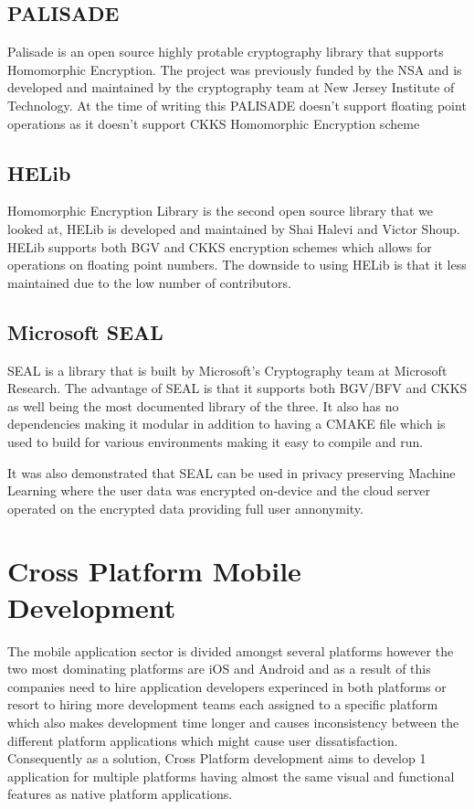 \subsection{PALISADE}
Palisade is an open source highly protable cryptography library that supports Homomorphic Encryption. The project was previously funded by the NSA and is developed and maintained by the cryptography
team at New Jersey Institute of Technology. At the time of writing this PALISADE doesn't support floating point operations as it doesn't support CKKS Homomorphic Encryption scheme
\subsection{HELib}
Homomorphic Encryption Library is the second open source library that we looked at, HELib is developed and maintained by Shai Halevi and Victor Shoup.
HELib supports both BGV and CKKS encryption schemes which allows for operations on floating point numbers.
The downside to using HELib is that it less maintained due to the low number of contributors.
\subsection{Microsoft SEAL}
SEAL is a library that is built by Microsoft’s Cryptography team at Microsoft Research\cite{SEAL}. The advantage of SEAL is that it supports both BGV/BFV and CKKS as well being the most documented library of the three.
It also has no dependencies making it modular in addition to having a CMAKE file which is used to build for various environments making it easy to compile and run.\par
It was also demonstrated that SEAL can be used in privacy preserving Machine Learning where the user data was encrypted on-device and the cloud server operated on the encrypted data providing
full user annonymity.
\section{Cross Platform Mobile Development}
The mobile application sector is divided amongst several platforms however the two most dominating platforms are iOS and Android and as a result of this companies need to hire application developers experinced in both platforms or resort to hiring more development teams each assigned to a specific platform which also makes development time longer and causes inconsistency between the different platform applications which might cause user dissatisfaction.
Consequently as a solution, Cross Platform development aims to develop 1 application for multiple platforms having almost the same visual and functional features as native platform applications.\cite{axelsson2016evaluation}
